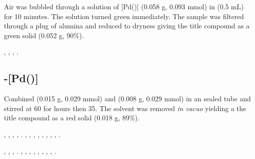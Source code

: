 Air was bubbled through a solution of [Pd(\tButhixantphos)] (0.058 g, 0.093 mmol) in  (0.5 mL) for 10 minutes.  The solution turned green immediately.  The sample was filtered through a plug of alumina and reduced to dryness giving the title compound as a green solid (0.052 g, 90\%).

,
,
,
.

\subsection*{\trans{}-[Pd(\tBusixantphos)]}


Combined \tBusixantphos{} (0.015 g, 0.029 mmol) and \ce{[Pd(cod)Cl2]} (0.008 g, 0.029 mmol) in an sealed tube and stirred at 60 \degC{} for hours then 35\degC{}.  The solvent was removed \emph{in vacuo} yielding a the title compound as a red solid (0.018 g, 89\%).

,
,
,
,
.
,
,
,
,
,
,
,
,
.

,
,
,
.
,
,
,
,
,
,
,
,
.

